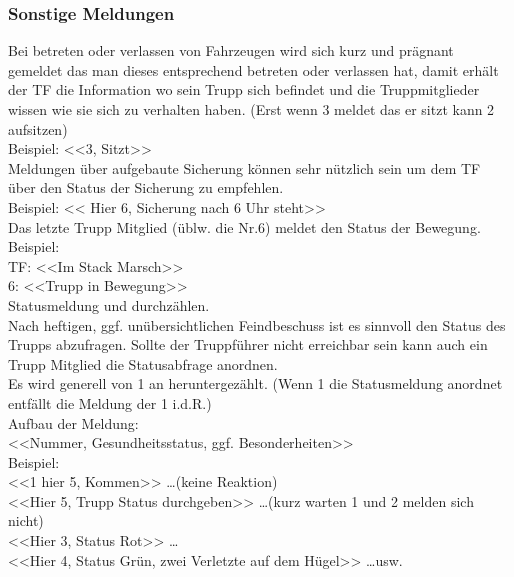 \subsubsection{Sonstige Meldungen}
	Bei betreten oder verlassen von Fahrzeugen wird sich kurz und prägnant gemeldet das man dieses entsprechend betreten oder verlassen hat, damit erhält der TF die Information wo sein Trupp sich befindet und die Truppmitglieder wissen wie sie sich zu verhalten haben. (Erst wenn 3 meldet das er sitzt kann 2 aufsitzen) \\
	Beispiel:  <<3, Sitzt>> \\

	Meldungen über aufgebaute Sicherung können sehr nützlich sein um dem TF über den Status der Sicherung zu empfehlen. \\
	Beispiel: << Hier 6, Sicherung nach 6 Uhr steht>> \\

	Das letzte Trupp Mitglied (üblw. die Nr.6) meldet den Status der Bewegung. \\
	Beispiel: \\
	TF: <<Im Stack Marsch>> \\
	6: <<Trupp in Bewegung>>  \\
	
	Statusmeldung und durchzählen. \\
	Nach heftigen, ggf. unübersichtlichen Feindbeschuss ist es sinnvoll den Status des Trupps abzufragen. Sollte der Truppführer nicht erreichbar sein kann auch ein Trupp Mitglied die Statusabfrage anordnen. \\
	Es wird generell von 1 an heruntergezählt. (Wenn 1 die Statusmeldung  anordnet entfällt die Meldung der 1 i.d.R.)  \\
	Aufbau der Meldung: \\
	<<Nummer, Gesundheitsstatus, ggf. Besonderheiten>>  \\
	Beispiel:\\
	 <<1 hier 5, Kommen>> \dots (keine Reaktion)\\  
	 <<Hier 5, Trupp Status durchgeben>> \dots (kurz warten 1 und 2 melden sich nicht)\\ <<Hier 3, Status Rot>> \dots\\ 
	 <<Hier 4, Status Grün, zwei Verletzte auf dem Hügel>> \dots usw. \\

